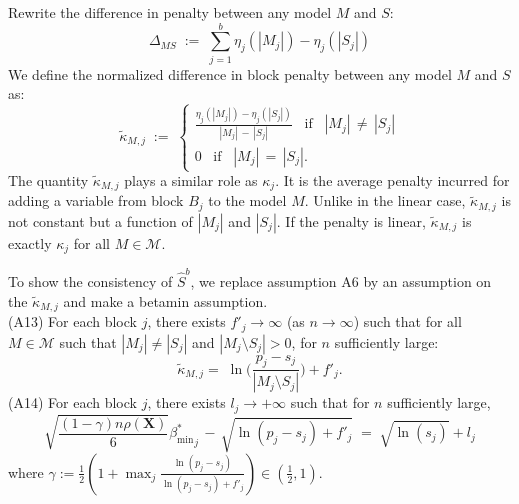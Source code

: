 \documentclass[aos]{imsart}
\theoremstyle{plain}
\newcommand{\M}{\mathcal{M}}
\newcommand{\bs}{\boldsymbol}
\begin{document}
Rewrite the difference in penalty between any model $M$ and $S$:
\begin{equation}\label{eq:DeltaMbis}
\Delta_{MS} \; := \; \sum_{j=1}^b \eta_j(|M_j|)-\eta_j(|S_j|)
\end{equation}
We define the normalized difference in block penalty between any model $M$ and $S$ as:
 $$\tilde{\kappa}_{M, j}\; := \; \begin{cases}
     \frac{\eta_j(|M_j|)-\eta_j(|S_j|)}{|M_j|\,-\,|S_j|} \;\;\; \text{if}\;\;\; |M_j|\,\neq\,|S_j| \\
     0 \;\;\;\text{if}\;\;\; |M_j|\,=\,|S_j|.
 \end{cases}  $$
The quantity $\tilde{\kappa}_{M, j}$ plays a similar role as $\kappa_j$. It is the average penalty incurred for adding a variable from block $B_j$ to the model $M$. Unlike in the linear case, $\tilde{\kappa}_{M, j}$ is not constant but a function of $|M_j|$ and $|S_j|$. If the penalty is linear, $\tilde{\kappa}_{M, j}$ is exactly $\kappa_j$ for all $M\in\M$.

To show the consistency of $\hat S^b$, we replace assumption A6 by an assumption on the $\tilde{\kappa}_{M, j}$ and make a betamin assumption.\\[5pt]
(A13) \quad For each block $j$, there exists $f'_j\to \infty$ (as $n\to \infty$) such that for all $M \in \M$ such that $|M_j| \neq |S_j|$ and $|M_j \setminus S_j| >0$, for $n$ sufficiently large:
\begin{equation*}
    \tilde{\kappa}_{M, j} =\;\ln\bigg(\frac{p_j-s_j}{|M_j \setminus S_j| }\bigg) + f'_j.
\end{equation*}
(A14) \quad For each block $j$, there exists $l_j\to +\infty$ such that for $n$ sufficiently large,
    \begin{equation*}
        \sqrt{\frac{(1-\gamma) n\rho(\bs X)}{6}}{{\beta_{\min}^*}_j} \,- \,\sqrt{\ln(p_j-s_j) + f'_j} \;=\; \sqrt{\ln(s_j)} + l_j
    \end{equation*}
where $\gamma:=\frac12(1+\max_j \frac{\ln(p_j-s_j)}{\ln(p_j-s_j) + f'_j})\in (\tfrac12,1)$.\\[5pt] 
\end{document}
